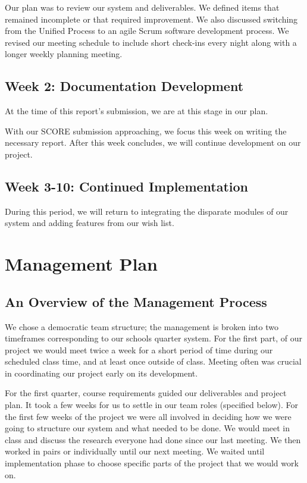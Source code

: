 \documentclass[12pt]{article}
\begin{document}
Our plan was to review our system and deliverables. We defined items that remained incomplete or that required improvement. We also discussed switching from the Unified Process to an agile Scrum software development process. We revised our meeting schedule to include short check-ins every night along with a longer weekly planning meeting. 

\subsection*{Week 2: Documentation Development}

At the time of this report's submission, we are at this stage in our plan.

With our SCORE submission approaching, we focus this week on writing the necessary report. After this week concludes, we will continue development on our project.

\subsection*{Week 3-10: Continued Implementation}

During this period, we will return to integrating the disparate modules of our system and adding features from our wish list.

\section{Management Plan} %

\subsection{An Overview of the Management Process}
We chose a democratic team structure; the management is broken into two timeframes corresponding to our schools quarter system. For the first part, of our project we would meet twice a week for a short period of time during our scheduled class time, and at least once outside of class. Meeting often was crucial in coordinating our project early on its development.

For the first quarter, course requirements guided our deliverables and project plan. It took a few weeks for us to settle in our team roles (specified below). For the first few weeks of the project we were all involved in deciding how we were going to structure our system and what needed to be done. We would meet in class and discuss the research everyone had done since our last meeting. We then worked in pairs or individually until our next meeting. We waited until implementation phase to choose specific parts of the project that we would work on. 
 
\end{document}

